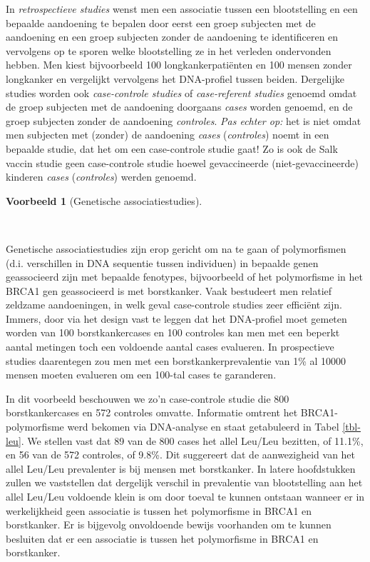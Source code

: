 \documentclass[
  dutch,
  letterpaper,
  12pt]{book}
\theoremstyle{definition}
\theoremstyle{definition}
\theoremstyle{definition}
\newtheorem{example}{Voorbeeld}[chapter]
\theoremstyle{remark}
\begin{document}
In \emph{retrospectieve studies} wenst men een associatie tussen een
blootstelling en een bepaalde aandoening te bepalen door eerst een groep
subjecten met de aandoening en een groep subjecten zonder de aandoening
te identificeren en vervolgens op te sporen welke blootstelling ze in
het verleden ondervonden hebben. Men kiest bijvoorbeeld 100
longkankerpatiënten en 100 mensen zonder longkanker en vergelijkt
vervolgens het DNA-profiel tussen beiden. Dergelijke studies worden ook
\emph{case-controle studies} of \emph{case-referent studies} genoemd
omdat de groep subjecten met de aandoening doorgaans \emph{cases} worden
genoemd, en de groep subjecten zonder de aandoening \emph{controles}.
\emph{Pas echter op:} het is niet omdat men subjecten met (zonder) de
aandoening \emph{cases} (\emph{controles}) noemt in een bepaalde studie,
dat het om een case-controle studie gaat! Zo is ook de Salk vaccin
studie geen case-controle studie hoewel gevaccineerde
(niet-gevaccineerde) kinderen \emph{cases} (\emph{controles}) werden
genoemd.

\begin{example}[Genetische
associatiestudies]\protect\hypertarget{exm-brcaLeu}{}\label{exm-brcaLeu}

~

\end{example}

Genetische associatiestudies zijn erop gericht om na te gaan of
polymorfismen (d.i. verschillen in DNA sequentie tussen individuen) in
bepaalde genen geassocieerd zijn met bepaalde fenotypes, bijvoorbeeld of
het polymorfisme in het BRCA1 gen geassocieerd is met borstkanker. Vaak
bestudeert men relatief zeldzame aandoeningen, in welk geval
case-controle studies zeer efficiënt zijn. Immers, door via het design
vast te leggen dat het DNA-profiel moet gemeten worden van 100
borstkankercases en 100 controles kan men met een beperkt aantal
metingen toch een voldoende aantal cases evalueren. In prospectieve
studies daarentegen zou men met een borstkankerprevalentie van 1\% al
10000 mensen moeten evalueren om een 100-tal cases te garanderen.

In dit voorbeeld beschouwen we zo'n case-controle studie die 800
borstkankercases en 572 controles omvatte. Informatie omtrent het
BRCA1-polymorfisme werd bekomen via DNA-analyse en staat getabuleerd in
Tabel \ref{tbl-leu}. We stellen vast dat 89 van de 800 cases het allel
Leu/Leu bezitten, of 11.1\%, en 56 van de 572 controles, of 9.8\%. Dit
suggereert dat de aanwezigheid van het allel Leu/Leu prevalenter is bij
mensen met borstkanker. In latere hoofdstukken zullen we vaststellen dat
dergelijk verschil in prevalentie van blootstelling aan het allel
Leu/Leu voldoende klein is om door toeval te kunnen ontstaan wanneer er
in werkelijkheid geen associatie is tussen het polymorfisme in BRCA1 en
borstkanker. Er is bijgevolg onvoldoende bewijs voorhanden om te kunnen
besluiten dat er een associatie is tussen het polymorfisme in BRCA1 en
borstkanker.
\end{document}
